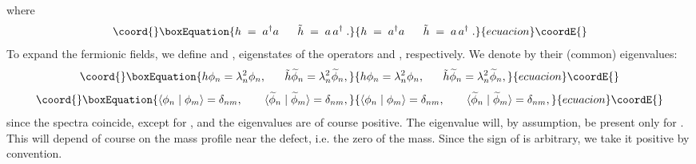 \documentclass[a4paper,12pt]{article}
\begin{document}
{{where
\begin{equation}\coord{}\boxEquation{
h \;=\; a^{\dagger} a \;\;\;\;\;\; \tilde{h} \;=\; a\,a^{\dagger}\;.
}{
h \;=\; a^{\dagger} a \;\;\;\;\;\; \tilde{h} \;=\; a\,a^{\dagger}\;.
}{ecuacion}\coordE{}\end{equation}
To expand the fermionic fields, we define \coordHE{} and
\coordHE{}, eigenstates of the operators \coordHE{} and
\coordHE{}, respectively. We denote by \coordHE{} their (common)
eigenvalues:
\begin{equation}\coord{}\boxEquation{
h \phi_n = \lambda_n^2 \phi_n , \;\;\;\;\;\;
\tilde{h} \widetilde{\phi}_n = \lambda_n^2 \widetilde{\phi}_n ,
}{
h \phi_n = \lambda_n^2 \phi_n , \;\;\;\;\;\;
\tilde{h} \widetilde{\phi}_n = \lambda_n^2 \widetilde{\phi}_n ,
}{ecuacion}\coordE{}\end{equation}
\begin{equation}\coord{}\boxEquation{
\langle \phi_n \mid \phi_m \rangle = \delta_{nm}, \;\;\;\;\;\;\;
\langle \widetilde{\phi}_n \mid \widetilde{\phi}_m \rangle = \delta_{nm} ,
}{
\langle \phi_n \mid \phi_m \rangle = \delta_{nm}, \;\;\;\;\;\;\;
\langle \widetilde{\phi}_n \mid \widetilde{\phi}_m \rangle = \delta_{nm} ,
}{ecuacion}\coordE{}\end{equation}
since the spectra coincide, except for \coordHE{}, and the
eigenvalues are of course positive.  The \coordHE{} eigenvalue
will, by assumption, be present only for \coordHE{}.  This will depend of
course on the mass profile near the defect, i.e. the zero of the mass.
Since the sign of \coordHE{} is arbitrary, we take it positive by
convention.

}}
\end{document}
